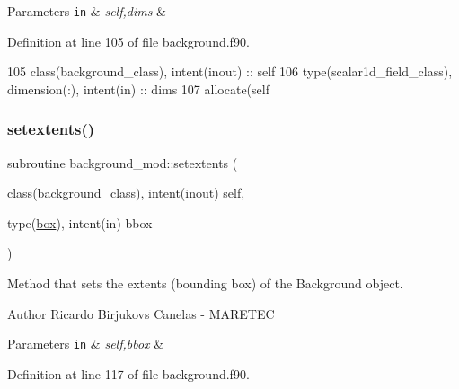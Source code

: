 \begin{DoxyParams}[1]{Parameters}
\mbox{\tt in}  & {\em self,dims} & \\
\hline
\end{DoxyParams}


Definition at line 105 of file background.\+f90.


\begin{DoxyCode}
105     \textcolor{keywordtype}{class}(background\_class), \textcolor{keywordtype}{intent(inout)} :: self
106     \textcolor{keywordtype}{type}(scalar1d\_field\_class), \textcolor{keywordtype}{dimension(:)}, \textcolor{keywordtype}{intent(in)} :: dims
107     \textcolor{keyword}{allocate}(self%
\end{DoxyCode}
\mbox{\label{namespacebackground__mod_ae8871564866fdd657a25f6a5a2256c33}} 
\subsubsection{\texorpdfstring{setextents()}{setextents()}}
{\footnotesize\ttfamily subroutine background\+\_\+mod\+::setextents (\begin{DoxyParamCaption}\item[{class(\mbox{\hyperlink{structbackground__mod_1_1background__class}{background\+\_\+class}}), intent(inout)}]{self,  }\item[{type(\mbox{\hyperlink{structgeometry__mod_1_1box}{box}}), intent(in)}]{bbox }\end{DoxyParamCaption})\hspace{0.3cm}{\ttfamily [private]}}



Method that sets the extents (bounding box) of the Background object. 

\begin{DoxyAuthor}{Author}
Ricardo Birjukovs Canelas -\/ M\+A\+R\+E\+T\+EC 
\end{DoxyAuthor}

\begin{DoxyParams}[1]{Parameters}
\mbox{\tt in}  & {\em self,bbox} & \\
\hline
\end{DoxyParams}


Definition at line 117 of file background.\+f90.


